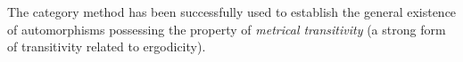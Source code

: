 The category method has been successfully used to establish the general existence of automorphisms possessing the property of \textit{metrical transitivity} (a strong form of transitivity related to ergodicity).
